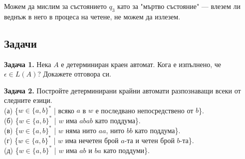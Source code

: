 \documentclass[openany]{book}
\begin{document}
    \begin{center}
    \end{center}

    \vspace{5pt}

    Можем да мислим за състоянието $q_3$ като за "мъртво състояние" — влезем ли веднъж в него в процеса на четене, не можем да излезем.

\vspace{25pt}

\subsection{Задачи}
    \textbf{Задача 1.} Нека $A$ е детерминиран краен автомат. Кога е изпълнено, че $\epsilon \in L(A)$? Докажете отговора си.

    \vspace{15pt}

    \textbf{Задача 2.} Постройте детерминирани крайни автомати разпознаващи всеки от следните езици. \\
    (а) \{$w \in \{a,b\}^*$ | всяко $a$ в $w$ е последвано непосредствено от $b$\}. \\
    (б) \{$w \in \{a,b\}^*$ | $w$ има $abab$ като поддума\}. \\
    (в) \{$w \in \{a,b\}^*$ | $w$ няма нито $aa$, нито $bb$ като поддума\}. \\
    (г) \{$w \in \{a,b\}^*$ | $w$ има нечетен брой $a$-та и четен брой $b$-та\}. \\
    (д) \{$w \in \{a,b\}^*$ | $w$ има $ab$ и $ba$ като поддуми\}.

    \vspace{15pt}
\end{document}
